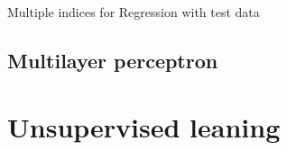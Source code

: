 \documentclass[journal]{IEEEtran}
\begin{document}
\begin{table}
    \centering
    \caption{Multiple indices for Regression with test
    data\label{tab:regression:index:test}}
\end{table}


\subsection{Multilayer perceptron\label{sec:nn}}

\section{Unsupervised leaning\label{sec:unsupervised}}
\printbibliography
\end{document}
